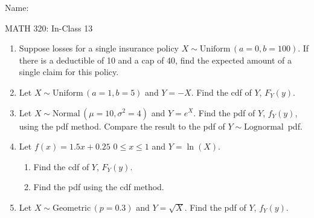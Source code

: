 \documentclass{article}
\newcommand{\follow}[1]{\sim \text{#1}\,}		%
\begin{document}
\hspace{375pt}Name:

\begin{center}
{\Huge MATH 320: In-Class 13}

\end{center}
\bigskip\bigskip



\begin{enumerate}
    \item Suppose losses for a single insurance policy $X \follow{Uniform}(a = 0, b = 100)$. If there is a deductible of 10 and a cap of 40, find the expected amount of a single claim for this policy.\vspace{200pt}%
    
    \item Let $X \follow{Uniform}(a = 1, b = 5)$ and $Y = -X$. Find the cdf of $Y$, $F_Y(y)$.\vspace{200pt}
    
    \item Let $X \follow{Normal}(\mu = 10, \sigma^2 = 4)$ and $Y = e^X$. Find the pdf of $Y$, $f_Y(y)$, using the pdf method. Compare the result to the pdf of $Y \follow{Lognormal}$ pdf.\vspace{200pt}%
    
    \item Let $f(x) = 1.5x + 0.25$ \quad $0 \le x \le 1$ and $Y = \ln(X)$.%
    \begin{enumerate}
        \item Find the cdf of $Y$, $F_Y(y)$.\vspace{200pt}
        \item Find the pdf using the cdf method.\vspace{200pt}
    \end{enumerate}
    
    \item Let $X \follow{Geometric}(p = 0.3)$ and $Y = \sqrt{X}$. Find the pdf of $Y$, $f_Y(y)$.\vspace{200pt}%

\end{enumerate}
\end{document}

